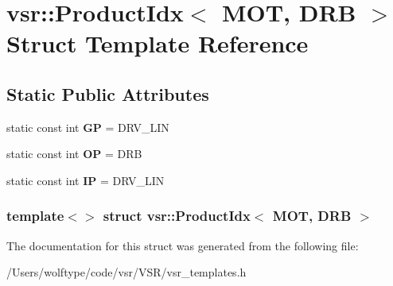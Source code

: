 \hypertarget{structvsr_1_1_product_idx_3_01_m_o_t_00_01_d_r_b_01_4}{\section{vsr\-:\-:Product\-Idx$<$ M\-O\-T, D\-R\-B $>$ Struct Template Reference}
\label{structvsr_1_1_product_idx_3_01_m_o_t_00_01_d_r_b_01_4}
}
\subsection*{Static Public Attributes}
\begin{DoxyCompactItemize}
\item 
\hypertarget{structvsr_1_1_product_idx_3_01_m_o_t_00_01_d_r_b_01_4_a98575a1d6b3ca59ed09964604a4969d7}{static const int {\bfseries G\-P} = D\-R\-V\-\_\-\-L\-I\-N}\label{structvsr_1_1_product_idx_3_01_m_o_t_00_01_d_r_b_01_4_a98575a1d6b3ca59ed09964604a4969d7}

\item 
\hypertarget{structvsr_1_1_product_idx_3_01_m_o_t_00_01_d_r_b_01_4_ae7a6ea544f1c890738852788f92911d5}{static const int {\bfseries O\-P} = D\-R\-B}\label{structvsr_1_1_product_idx_3_01_m_o_t_00_01_d_r_b_01_4_ae7a6ea544f1c890738852788f92911d5}

\item 
\hypertarget{structvsr_1_1_product_idx_3_01_m_o_t_00_01_d_r_b_01_4_a4974bf0279a9cae771a90216748c0074}{static const int {\bfseries I\-P} = D\-R\-V\-\_\-\-L\-I\-N}\label{structvsr_1_1_product_idx_3_01_m_o_t_00_01_d_r_b_01_4_a4974bf0279a9cae771a90216748c0074}

\end{DoxyCompactItemize}
\subsubsection*{template$<$$>$ struct vsr\-::\-Product\-Idx$<$ M\-O\-T, D\-R\-B $>$}



The documentation for this struct was generated from the following file\-:\begin{DoxyCompactItemize}
\item 
/\-Users/wolftype/code/vsr/\-V\-S\-R/vsr\-\_\-templates.\-h\end{DoxyCompactItemize}
